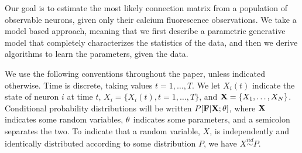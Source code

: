 Our goal is to estimate the most likely connection matrix from a population of observable neurons, given only their calcium fluorescence observations.  We take a model based approach, meaning that we first describe a parametric generative model that completely characterizes the statistics of the data, and then we derive algorithms to learn the parameters, given the data.  

We use the following conventions throughout the paper, unless indicated otherwise.  Time is discrete, taking values $t=1,\ldots,T$.  We let $X_i(t)$ indicate the state of neuron $i$ at time $t$, $X_i=\{X_i(t), t=1,\ldots, T\}$, and ${\bf X}= \{X_1, \ldots, X_N\}$.  Conditional probability distributions will be written $P[\bf F | \bf X; \mathbf{\theta}]$, where $\bf X$ indicates some random variables, $\mathbf{\theta}$ indicates some parameters, and a semicolon separates the two. To indicate that a random variable, $X$, is independently and identically distributed according to some distribution $P$, we have $X \overset{iid}{\sim} P$.  


% 
% 
